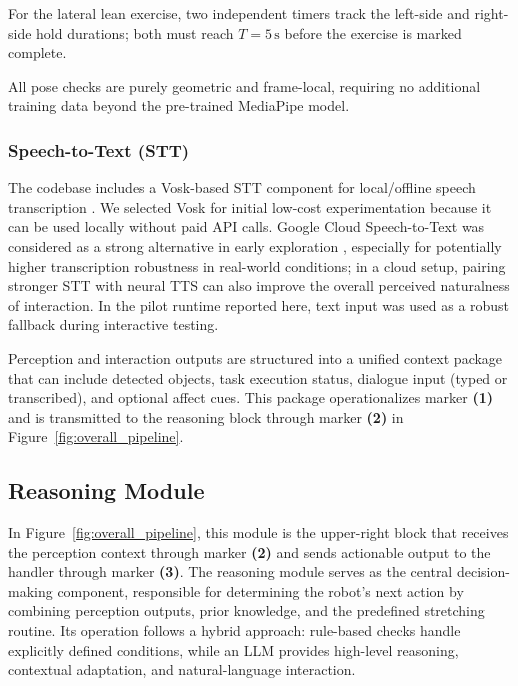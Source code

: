 \documentclass[pdflatex,sn-basic,Numbered,iicol,twocolumn]{sn-jnl}%
\begin{document}
For the lateral lean exercise, two independent timers track the left-side and right-side hold durations; both must reach $T = 5\,\text{s}$ before the exercise is marked complete.

All pose checks are purely geometric and frame-local, requiring no additional training data beyond the pre-trained MediaPipe model.

\subsubsection{Speech-to-Text (STT)}
The codebase includes a Vosk-based STT component for local/offline speech transcription \cite{Vosk2021}. We selected Vosk for initial low-cost experimentation because it can be used locally without paid API calls. Google Cloud Speech-to-Text was considered as a strong alternative in early exploration \cite{GoogleSTT2023}, especially for potentially higher transcription robustness in real-world conditions; in a cloud setup, pairing stronger STT with neural TTS can also improve the overall perceived naturalness of interaction. In the pilot runtime reported here, text input was used as a robust fallback during interactive testing.

Perception and interaction outputs are structured into a unified context package that can include detected objects, task execution status, dialogue input (typed or transcribed), and optional affect cues. This package operationalizes marker \textbf{(1)} and is transmitted to the reasoning block through marker \textbf{(2)} in Figure~\ref{fig:overall_pipeline}.

\subsection{Reasoning Module}

In Figure~\ref{fig:overall_pipeline}, this module is the upper-right block that receives the perception context through marker \textbf{(2)} and sends actionable output to the handler through marker \textbf{(3)}. The reasoning module serves as the central decision-making component, responsible for determining the robot's next action by combining perception outputs, prior knowledge, and the predefined stretching routine. Its operation follows a hybrid approach: rule-based checks handle explicitly defined conditions, while an LLM provides high-level reasoning, contextual adaptation, and natural-language interaction.
\end{document}
